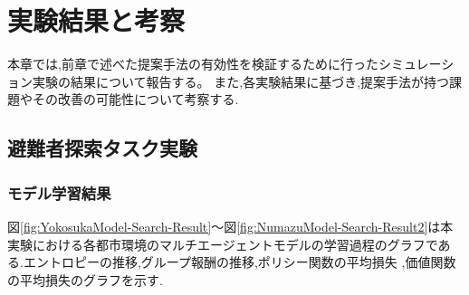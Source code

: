 \chapter{実験結果と考察}
本章では,前章で述べた提案手法の有効性を検証するために行ったシミュレーション実験の結果について報告する。
また,各実験結果に基づき,提案手法が持つ課題やその改善の可能性について考察する.

\section{避難者探索タスク実験}
\subsection{モデル学習結果}
図\ref{fig:YokosukaModel-Search-Result}～図\ref{fig:NumazuModel-Search-Result2}は本実験における各都市環境のマルチエージェントモデルの学習過程のグラフである.エントロピーの推移,グループ報酬の推移,ポリシー関数の平均損失
,価値関数の平均損失のグラフを示す.
